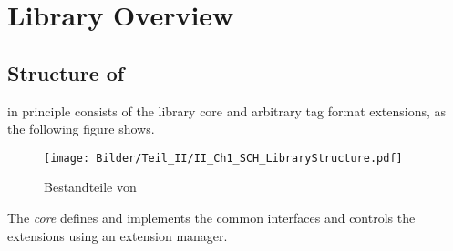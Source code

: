 
\chapter{Library Overview}
\label{sec:LibraryOverview}



\section{Structure of \LibName{}}
\label{sec:BestandteileVonLibName}

\LibName{} in principle consists of the library core and arbitrary tag format extensions, as the following figure shows.

\begin{figure}[H]
	\centering
		\texttt{[image: Bilder/Teil\_II/II\_Ch1\_SCH\_LibraryStructure.pdf]}
	\caption{Bestandteile von \LibName{}}
	\label{fig:DefaultExtensions}
\end{figure}

The \LibName{} \emph{core} defines and implements the common interfaces and controls the extensions using an extension manager.

%
%
